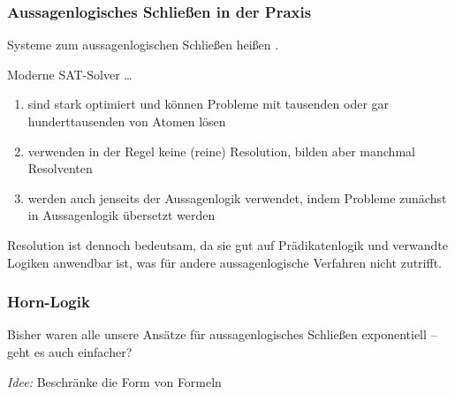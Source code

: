 \documentclass[aspectratio=1610,onlymath]{beamer}
\begin{document}
\begin{frame}\frametitle{Aussagenlogisches Schließen in der Praxis}

Systeme zum aussagenlogischen Schließen heißen .
\bigskip

Moderne SAT-Solver \ldots
\begin{enumerate}[$\ldots$]
\item sind \alert{stark optimiert} und können Probleme mit tausenden oder gar hunderttausenden von Atomen lösen
\item verwenden in der Regel \alert{keine (reine) Resolution}, bilden aber manchmal Resolventen
\item werden auch \alert{jenseits der Aussagenlogik} verwendet, indem Probleme zunächst in Aussagenlogik übersetzt werden
\end{enumerate}\bigskip

Resolution ist dennoch bedeutsam, da sie gut auf Prädikatenlogik und verwandte Logiken anwendbar ist, was für andere aussagenlogische Verfahren nicht zutrifft.

\end{frame}


\begin{frame}\frametitle{Horn-Logik}

Bisher waren alle unsere Ansätze für aussagenlogisches Schließen exponentiell -- geht es auch einfacher?
\bigskip\pause

\emph{Idee:} Beschränke die Form von Formeln
\bigskip


\pause
{}

\end{frame}
\end{document}
